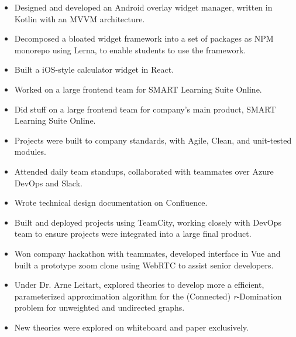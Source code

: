 \documentclass[11pt, a4paper]{article}
\begin{document}
\noindent
{
  \hfill
}
\vspace{-0.08in}
\begin{itemize}
  \item Designed and developed an Android overlay widget manager, written in Kotlin with an MVVM architecture.
        \vspace{-0.1in}
  \item Decomposed a bloated widget framework into a set of packages as NPM monorepo using Lerna, to enable students to use the framework.
        \vspace{-0.1in}
  \item Built a iOS-style calculator widget in React.
        \vspace{-0.1in}
  \item Worked on a large frontend team for SMART Learning Suite Online.
        \vspace{-0.1in}
  \item Did stuff on a large frontend team for company's main product, SMART Learning Suite Online.
        \vspace{-0.1in}
  \item Projects were built to company standards, with Agile, Clean, and unit-tested modules.
        \vspace{-0.1in}
  \item Attended daily team standups, collaborated with teammates over Azure DevOps and Slack.
        \vspace{-0.1in}
  \item Wrote technical design documentation on Confluence.
        \vspace{-0.1in}
  \item Built and deployed projects using TeamCity, working closely with DevOps team to ensure projects were integrated into a large final product.
        \vspace{-0.1in}
  \item Won company hackathon with teammates, developed interface in Vue and built a prototype zoom clone using WebRTC to assist senior developers.
\end{itemize}
\vspace{-0.05in}

\noindent
{
  \hfill
}

\noindent
{
  \hfill
}
\vspace{-0.08in}
\begin{itemize}
  \item Under Dr. Arne Leitart, explored theories to develop more a efficient, parameterized
        approximation algorithm for the (Connected) {\it r}-Domination problem for unweighted
        and undirected graphs.
        \vspace{-0.1in}
  \item New theories were explored on whiteboard and paper exclusively.
\end{itemize}
\vspace{-0.05in}
\end{document}
